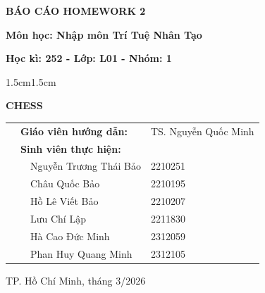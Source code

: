 \documentclass[12pt, a4paper]{report}
\theoremstyle{definition}
\begin{document}
\begin{titlepage}
\begin{center}
            \large
            
            \textbf{BÁO CÁO HOMEWORK 2}
            
            \textbf{Môn học: Nhập môn Trí Tuệ Nhân Tạo} 
            
            \textbf{Học kì: 252 - Lớp: L01 - Nhóm: 1}

            \vspace{0.5cm}
            
            \begin{changemargin}{1.5cm}{1.5cm}
                \begin{center}
                    
                    \Large
                    \textbf{CHESS}
                \end{center}
            \end{changemargin}
            
            \vspace{0.5cm}

		  \normalsize
            
            {
            \begin{center}
            \renewcommand{\arraystretch}{1.25}
            \begin{tabular}{ p{0.5cm} p{0.5cm} p{6cm} p{5cm} }
				& \multicolumn{2}{l}{\textbf{Giáo viên hướng dẫn:}} & TS. Nguyễn Quốc Minh \\
    
				& \multicolumn{3}{l}{\textbf{Sinh viên thực hiện:}} \\
				\vspace{0.5cm}
				& &Nguyễn Trương Thái Bảo		&2210251 \\
				& &Châu Quốc Bảo		&2210195 \\
				& &Hồ Lê Viết Bảo		&2210207 \\
				& &Lưu Chí Lập		&2211830 \\
				& &Hà Cao Đức Minh		&2312059 \\
				& &Phan Huy Quang Minh		&2312105 \\

		\end{tabular}
            \end{center}
            }

                \vspace{2cm}

                \footnotesize
                TP. Hồ Chí Minh, tháng 3/2026

                \vspace{5mm}
        \end{center}
    \end{titlepage}
\end{document}
